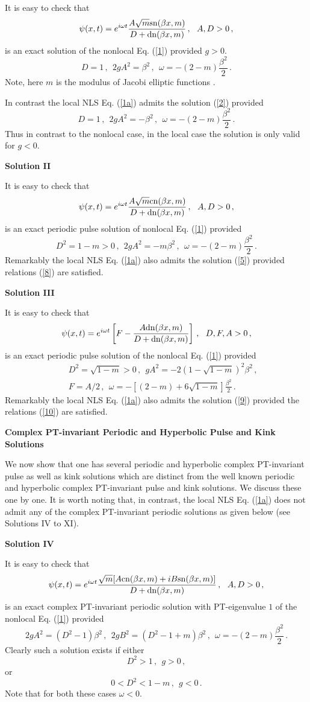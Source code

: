 \documentclass[11pt]{article}
\newcommand{\be}{\begin{equation}}
\newcommand{\ee}{\end{equation}}
\newcommand{\bea}{\begin{eqnarray}}
\newcommand{\eea}{\end{eqnarray}}
\newcommand{\sn}{{\rm sn}}
\newcommand{\dn}{{\rm dn}}
\newcommand{\cn}{{\rm cn}}
\begin{document}
It is easy to check that 
\be\label{2}
\psi(x,t) = e^{i\omega t} \frac{A\sqrt{m}\sn(\beta x,m)}{D+\dn(\beta x,m)}\,,
~~A, D > 0\,,
\ee
is an exact solution of the nonlocal Eq. (\ref{1}) provided $g > 0$. 
\be\label{3}
D = 1\,,~~2 g A^2 = \beta^2\,,~~\omega = -(2-m)\frac{\beta^2}{2}\,.
\ee
Note, here $m$ is the modulus of Jacobi elliptic functions \cite{as}.

In contrast the local NLS Eq. (\ref{1a}) admits the solution (\ref{2})
provided  
\be\label{4}
D = 1\,,~~2 g A^2 = -\beta^2\,,~~\omega = -(2-m)\frac{\beta^2}{2}\,.
\ee
Thus in contrast to the nonlocal case, in the local case the solution is
only valid for $g < 0$.  

{\bf Solution II}

It is easy to check that 
\be\label{5}
\psi(x,t) = e^{i\omega t} \frac{A\sqrt{m}\cn(\beta x,m)}{D+\dn(\beta x,m)}\,,
~~A, D > 0\,,
\ee
is an exact periodic pulse solution of nonlocal Eq. (\ref{1}) provided
\be\label{8}
D^2 = 1-m > 0\,,~~2 g A^2 = -m \beta^2\,,~~\omega = -(2-m)\frac{\beta^2}{2}\,.
\ee
Remarkably the local NLS Eq. (\ref{1a}) also admits the solution (\ref{5})
provided relations (\ref{8}) are satisfied.


{\bf Solution III}

It is easy to check that 
\be\label{9}
\psi(x,t) = e^{i\omega t} \left[F-\frac{A\dn(\beta x,m)}{D+\dn(\beta x,m)}\right]\,,
~~D,F,A > 0\,,
\ee
is an exact periodic pulse solution of the nonlocal Eq. (\ref{1}) provided
\bea\label{10}
&&D^2 = \sqrt{1-m} > 0\,,~~ g A^2 = -2(1-\sqrt{1-m})^2 \beta^2\,,
\nonumber \\
&&F = A/2\,,~~\omega = -[(2-m)+6\sqrt{1-m}]\frac{\beta^2}{2}\,.
\eea
Remarkably the local NLS Eq. (\ref{1a}) also admits the solution (\ref{9})
provided the relations (\ref{10}) are satisfied.

{\bf Complex PT-invariant Periodic and Hyperbolic Pulse 
and Kink Solutions}

We now show that one has several periodic and hyperbolic complex
PT-invariant pulse as well as kink solutions which are distinct from 
the well known  periodic and  hyperbolic complex PT-invariant pulse
and kink solutions. We discuss these one by one. It is worth noting that,
in contrast, the local NLS Eq. (\ref{1a}) does not admit any of the complex
PT-invariant periodic solutions as given below (see Solutions IV to XI).

{\bf Solution IV}

It is easy to check that 
\be\label{11}
\psi(x,t) = e^{i\omega t} \frac{\sqrt{m}[A\cn(\beta x,m)+iB\sn(\beta x,m)]}
{D+\dn(\beta x,m)}\,,
~~A, D > 0\,,
\ee
is an exact complex PT-invariant periodic solution with PT-eigenvalue 
$1$ of the nonlocal Eq. (\ref{1}) provided
\be\label{12}
2g A^2 = (D^2-1)\beta^2\,,~~2g B^2 = (D^2-1+m)\beta^2\,,~~
\omega = -(2-m)\frac{\beta^2}{2}\,.
\ee
Clearly such a solution exists if either
\be\label{13}
D^2 > 1\,,~~g > 0\,,
\ee
or
\be\label{14}
0 < D^2 < 1-m\,,~~g < 0\,.
\ee
Note that for both these cases $\omega < 0$. 
\end{document}

